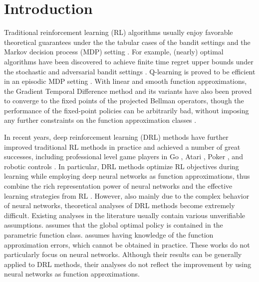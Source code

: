 \section{Introduction}
\label{sec:introduction}

Traditional reinforcement learning (RL) algorithms usually enjoy favorable theoretical guarantees under the the tabular cases of the bandit settings and the Markov decision process (MDP) setting \citep{sutton2018reinforcement}.
For example, (nearly) optimal algorithms have been discovered to achieve finite time regret upper bounds under the stochastic and adversarial bandit settings \citep{bubeck2012regret}. Q-learning is proved to be efficient in an episodic MDP setting \cite{jin2018q}. With linear and smooth function approximations, the Gradient Temporal Difference method and its variants have also been proved to converge to the fixed points of the projected Bellman operators, though the performance of the fixed-point policies can be arbitrarily bad, without imposing any further constraints on the function approximation classes \citep{sutton2009fast,sutton2009convergent,bhatnagar2009convergent}.

In recent years, deep reinforcement learning (DRL) methods have further improved traditional RL methods in practice and achieved a number of great successes, including professional level game players in Go \citep{silver2016masteringA,silver2017masteringB}, Atari \citep{mnih2015human}, Poker \citep{moravvcik2017deepstack}, and robotic controls \citep{lillicrap2015continuous,levine2016end}.
In particular, DRL methods optimize RL objectives during learning while employing deep neural networks as function approximations, thus combine the rich representation power of neural networks and the effective learning strategies from RL \citep{sutton2018reinforcement}. 
However, also mainly due to the complex behavior of neural networks, theoretical analyses of DRL methods become extremely difficult.
Existing analyses in the literature usually contain various unverifiable assumptions. \citep{krishnamurthy2016pac} assumes that the global optimal policy is contained in the parametric function class. \citep{dai2018sbeed} assumes having knowledge of the function approximation errors, which cannot be obtained in practice.
These works do not particularly focus on neural networks. Although their results can be generally applied to DRL methods, their analyses do not reflect the improvement by using neural networks as function approximations. 

